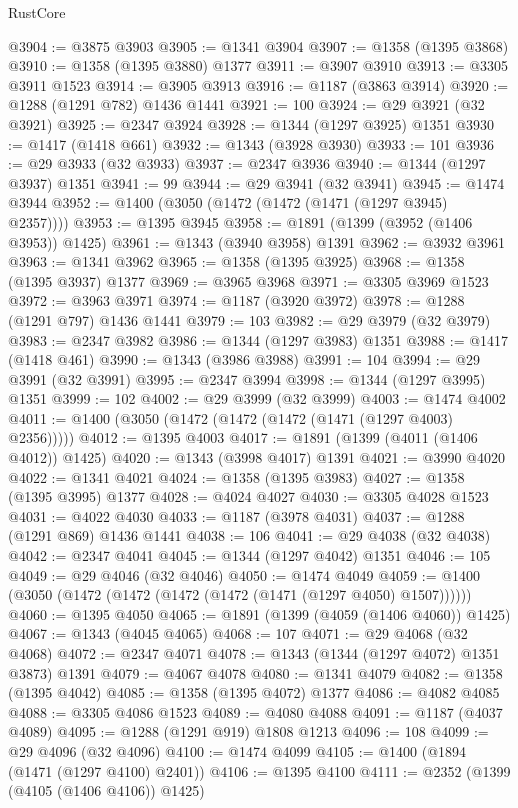 \begin{lexlean}{RustCore}
\begin{coremodule}
{\begin{coremodule}
{{{{{{{{{{{{{{{{{{{{{{{{{{{{{{{{{{{{{{{{{{{{@3904 := @3875 @3903
@3905 := @1341 @3904
@3907 := @1358 (@1395 @3868)
@3910 := @1358 (@1395 @3880) @1377
@3911 := @3907 @3910
@3913 := @3305 @3911 @1523
@3914 := @3905 @3913
@3916 := @1187 (@3863 @3914)
@3920 := @1288 (@1291 @782) @1436 @1441
@3921 := 100
@3924 := @29 @3921 (@32 @3921)
@3925 := @2347 @3924
@3928 := @1344 (@1297 @3925) @1351
@3930 := @1417 (@1418 @661)
@3932 := @1343 (@3928 @3930)
@3933 := 101
@3936 := @29 @3933 (@32 @3933)
@3937 := @2347 @3936
@3940 := @1344 (@1297 @3937) @1351
@3941 := 99
@3944 := @29 @3941 (@32 @3941)
@3945 := @1474 @3944
@3952 := @1400 (@3050 (@1472 (@1472 (@1471 (@1297 @3945) @2357))))
@3953 := @1395 @3945
@3958 := @1891 (@1399 (@3952 (@1406 @3953)) @1425)
@3961 := @1343 (@3940 @3958) @1391
@3962 := @3932 @3961
@3963 := @1341 @3962
@3965 := @1358 (@1395 @3925)
@3968 := @1358 (@1395 @3937) @1377
@3969 := @3965 @3968
@3971 := @3305 @3969 @1523
@3972 := @3963 @3971
@3974 := @1187 (@3920 @3972)
@3978 := @1288 (@1291 @797) @1436 @1441
@3979 := 103
@3982 := @29 @3979 (@32 @3979)
@3983 := @2347 @3982
@3986 := @1344 (@1297 @3983) @1351
@3988 := @1417 (@1418 @461)
@3990 := @1343 (@3986 @3988)
@3991 := 104
@3994 := @29 @3991 (@32 @3991)
@3995 := @2347 @3994
@3998 := @1344 (@1297 @3995) @1351
@3999 := 102
@4002 := @29 @3999 (@32 @3999)
@4003 := @1474 @4002
@4011 := @1400 (@3050 (@1472 (@1472 (@1472 (@1471 (@1297 @4003) @2356)))))
@4012 := @1395 @4003
@4017 := @1891 (@1399 (@4011 (@1406 @4012)) @1425)
@4020 := @1343 (@3998 @4017) @1391
@4021 := @3990 @4020
@4022 := @1341 @4021
@4024 := @1358 (@1395 @3983)
@4027 := @1358 (@1395 @3995) @1377
@4028 := @4024 @4027
@4030 := @3305 @4028 @1523
@4031 := @4022 @4030
@4033 := @1187 (@3978 @4031)
@4037 := @1288 (@1291 @869) @1436 @1441
@4038 := 106
@4041 := @29 @4038 (@32 @4038)
@4042 := @2347 @4041
@4045 := @1344 (@1297 @4042) @1351
@4046 := 105
@4049 := @29 @4046 (@32 @4046)
@4050 := @1474 @4049
@4059 := @1400 (@3050 (@1472 (@1472 (@1472 (@1472 (@1471 (@1297 @4050) @1507))))))
@4060 := @1395 @4050
@4065 := @1891 (@1399 (@4059 (@1406 @4060)) @1425)
@4067 := @1343 (@4045 @4065)
@4068 := 107
@4071 := @29 @4068 (@32 @4068)
@4072 := @2347 @4071
@4078 := @1343 (@1344 (@1297 @4072) @1351 @3873) @1391
@4079 := @4067 @4078
@4080 := @1341 @4079
@4082 := @1358 (@1395 @4042)
@4085 := @1358 (@1395 @4072) @1377
@4086 := @4082 @4085
@4088 := @3305 @4086 @1523
@4089 := @4080 @4088
@4091 := @1187 (@4037 @4089)
@4095 := @1288 (@1291 @919) @1808 @1213
@4096 := 108
@4099 := @29 @4096 (@32 @4096)
@4100 := @1474 @4099
@4105 := @1400 (@1894 (@1471 (@1297 @4100) @2401))
@4106 := @1395 @4100
@4111 := @2352 (@1399 (@4105 (@1406 @4106)) @1425)
}}}}}}}}}}}}}}}}}}}}}}}}}}}}}}}}}}}}}}}}}}}}
\end{coremodule}}
\end{coremodule}
\end{lexlean}
